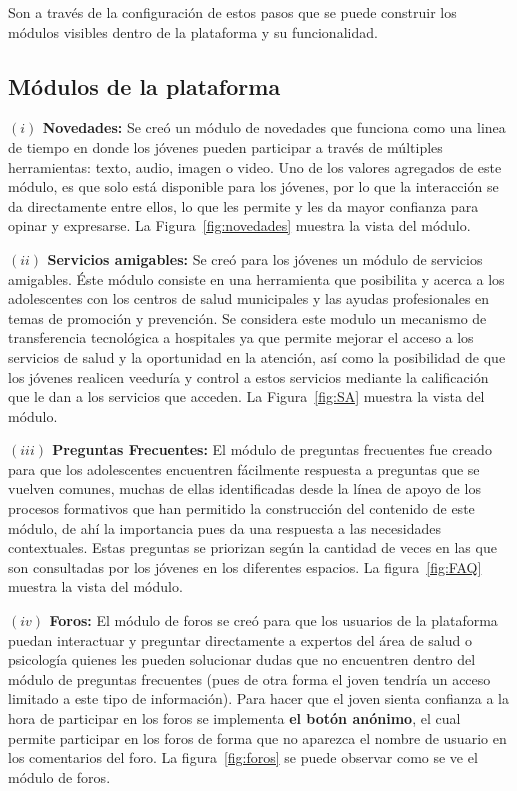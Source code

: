\documentclass[journal,transmag]{IEEEtran}
\begin{document}
Son a través de la configuración de estos pasos que se puede construir los módulos visibles dentro de la plataforma y su funcionalidad.

\subsection{Módulos de la plataforma}

\textbf{$(i)$ Novedades:} Se creó un módulo de novedades que funciona como una linea de tiempo en donde los jóvenes pueden participar a través de múltiples herramientas: texto,  audio, imagen o video. Uno de los valores agregados de este módulo, es que solo está disponible para los jóvenes, por lo que la interacción se da directamente entre ellos, lo que les permite y les da mayor confianza para opinar y expresarse. La Figura~\ref{fig:novedades} muestra la vista del módulo.

\textbf{$(ii)$ Servicios amigables:} Se creó para los jóvenes un módulo de servicios amigables. Éste módulo consiste en una herramienta que posibilita y acerca a los adolescentes con los centros de salud municipales y las ayudas profesionales en temas de promoción y prevención. Se considera este modulo un mecanismo de transferencia tecnológica a hospitales ya que permite mejorar el acceso a los servicios de salud y la oportunidad en la atención, así como la posibilidad de que los jóvenes realicen veeduría y control a estos servicios mediante la calificación que le dan a los servicios que acceden. La Figura~\ref{fig:SA} muestra la vista del módulo.

\textbf{$(iii)$ Preguntas Frecuentes:} El módulo de preguntas frecuentes fue creado para que los adolescentes encuentren fácilmente respuesta a preguntas que se vuelven comunes, muchas de ellas identificadas desde la línea de apoyo de los procesos formativos que han permitido la construcción del contenido de este módulo, de ahí la importancia pues da una respuesta a las necesidades contextuales. Estas preguntas se priorizan según la cantidad de veces en las que son consultadas por los jóvenes en los diferentes espacios. La figura~\ref{fig:FAQ} muestra la vista del módulo.

\textbf{$(iv)$ Foros:} El módulo de foros se creó para que los usuarios de la plataforma puedan interactuar y preguntar directamente a expertos del área de salud o psicología quienes les pueden solucionar dudas que no encuentren dentro del módulo de preguntas frecuentes (pues de otra forma el joven tendría un acceso limitado a este tipo de información). Para hacer que el joven sienta confianza a la hora de participar en los foros se implementa  \textbf{el botón anónimo}, el cual permite participar en los foros de forma que no aparezca el nombre de usuario en los comentarios del foro. La figura~\ref{fig:foros} se puede observar como se ve el módulo de foros.
\end{document}
